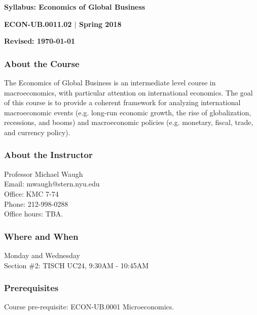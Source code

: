 \documentclass[12pt,pdftex,twoside,letterpaper]{exam}
\begin{document}
\centerline{\Large\bf Syllabus:  Economics of Global Business}
\vspace{1mm}
\centerline{\large\bf ECON-UB.0011.02 $|$ Spring 2018}
\vspace{3mm}
\centerline{\bf Revised:  \today}

\vspace{-.25cm}

\subsubsection*{About the Course}

The Economics of Global Business is an intermediate level course in macroeconomics, with particular attention on international economics. The goal of this course is to provide a coherent framework for analyzing international macroeconomic events (e.g. long-run economic growth, the rise of globalization, recessions, and booms) and macroeconomic policies (e.g. monetary, fiscal, trade, and currency policy).

\subsubsection*{About the Instructor}
Professor Michael Waugh\\
Email: mwaugh@stern.nyu.edu\\
Office: KMC 7-74\\
Phone: 212-998-0288\\
Office hours: TBA.

\subsubsection*{Where and When}
Monday and Wednesday \\
Section \#2: TISCH UC24, 9:30AM - 10:45AM

\subsubsection*{Prerequisites}

Course pre-requisite: ECON-UB.0001 Microeconomics.
\end{document}
